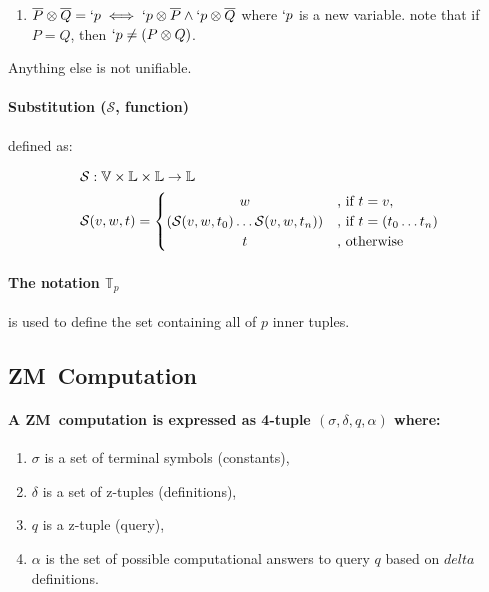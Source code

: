 \documentclass[11pt,a4paper]{report}
\newcommand{\zm}{ZM}
\newcommand{\var}[1]{`#1}
\newcommand{\unify}{\otimes}
\begin{document}
\begin{enumerate}
\item $\overline{P} \unify \overline{Q} = \var{p} \iff \var{p} \unify \overline{P} \wedge \var{p} \unify \overline{Q}$
    \subitem where $\var{p}$ is a new variable.
    \subitem note that if $P = Q$, then $\var{p} \neq (P \unify Q)$.
\end{enumerate}

Anything else is not unifiable.

\paragraph{Substitution ($\mathcal{S}$, function)} defined as:

\begin{align}
    \mathcal{S}&: \mathbb{V} \times \mathbb{L} \times \mathbb{L} \rightarrow \mathbb{L}\\
    \mathcal{S}&(v, w, t) =
    \begin{cases}
        \hfill w \hfill &\text{, if } t = v,\\
        \hfill (\mathcal{S}(v, w, t_{0}) \ldots \mathcal{S}(v, w, t_{n})) \hfill & \text{, if } t = (t_{0} \ldots t_{n})\\
        \hfill t \hfill & \text{, otherwise}
    \end{cases}
\end{align}


\paragraph{The notation $\mathbb{T}_{p}$} is used to define the set containing all of $p$ inner tuples.

\subsection{\zm\ Computation}
\paragraph{A \zm\ computation is expressed as 4-tuple $(\sigma, \delta, q, \alpha)$ where:}

\begin{enumerate}
\item $\sigma$ is a set of terminal symbols (constants),
\item $\delta$ is a set of z-tuples (definitions),
\item $q$ is a z-tuple (query),
\item $\alpha$ is the set of possible computational answers to query $q$ based on $delta$ definitions.
\end{enumerate}
\end{document}
